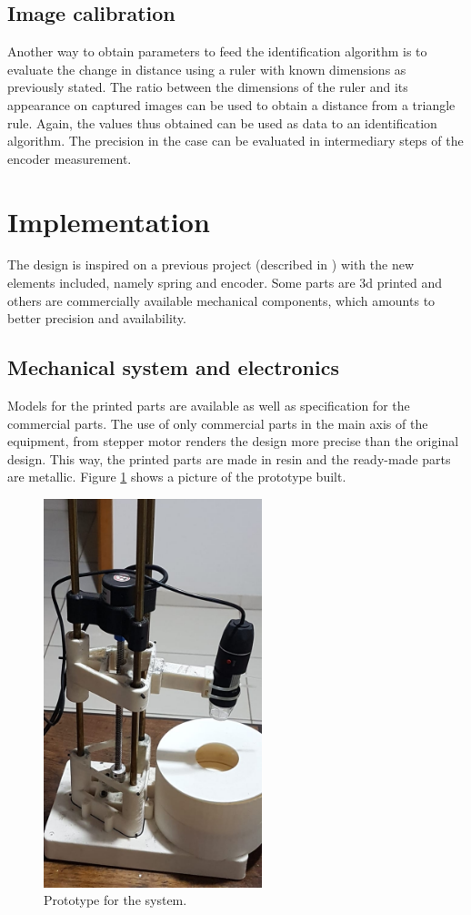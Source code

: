 \documentclass[journal]{IEEEtran}
\begin{document}
\subsection{Image calibration}

Another way to obtain parameters to feed the identification algorithm is to evaluate the change in distance using a ruler with known dimensions as previously stated. The ratio between the dimensions of the ruler and its appearance on captured images can be used to obtain a distance from a triangle rule. Again, the values thus obtained can be used as data to an identification algorithm. The precision in the case can be evaluated in intermediary steps of the encoder measurement.


\section{Implementation}

The design is inspired on a previous project (described in \cite{Lelis2017}) with the new elements included, namely spring and encoder. Some parts are 3d printed and others are commercially available mechanical components, which amounts to better precision and availability.

\subsection{Mechanical system and electronics}

Models for the printed parts are available as well as specification for the commercial parts. The use of only commercial parts in the main axis of the equipment, from stepper motor renders the design more precise than the original design. This way, the printed parts are made in resin and the ready-made parts are metallic. Figure \ref{fig:picture} shows a picture of the prototype built.

\begin{figure}[!t]
\centering
\includegraphics[width=2.5in]{microscope.jpeg}
\caption{Prototype for the system.}
\label{fig:picture}
\end{figure}
\end{document}
